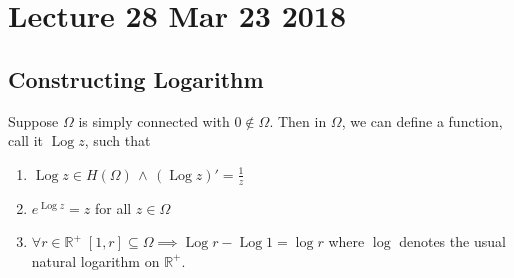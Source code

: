 \documentclass[notoc,notitlepage]{tufte-book}
\DeclareMathOperator{\Log}{Log}
\begin{document}


\chapter{Lecture 28 Mar 23 2018}
  \label{chapter:lecture_28_mar_23_2018}

\section{Constructing Logarithm} %
\label{sec:constructing_logarithm}

\begin{thm}[Theorem 17]\label{thm:theorem_17}
  Suppose $\Omega$ is simply connected with $0 \not\in \Omega$. Then in $\Omega$, we can define a function, call it $\Log z$, such that
  \begin{enumerate}
    \item $\Log z \in H(\Omega) \, \land \, \left( \Log z \right)' = \frac{1}{z}$
    \item $e^{\Log z} = z$ for all $z \in \Omega$
    \item $\forall r \in \mathbb{R}^+ \; [1, r] \subseteq \Omega \implies \Log r - \Log 1 = \log r$ where $\log$ denotes the usual natural logarithm on $\mathbb{R}^+$.
  \end{enumerate}
\end{thm}
\end{document}
